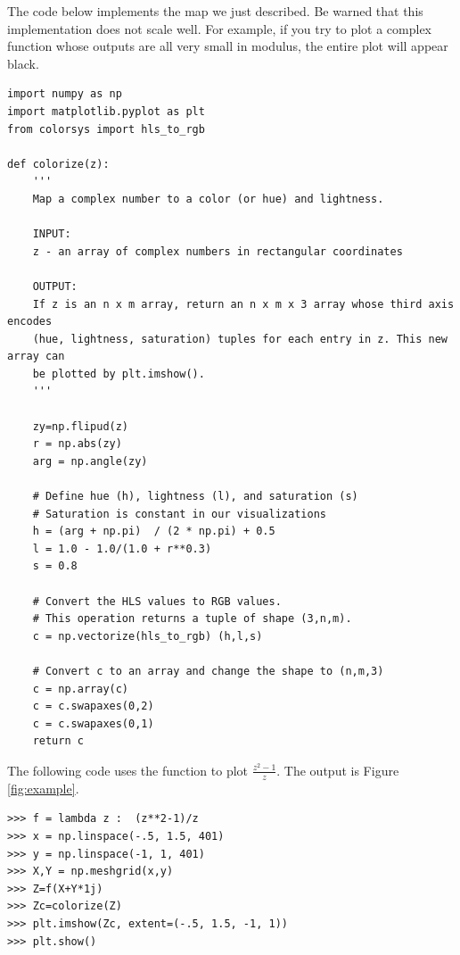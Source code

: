 The code below implements the map we just described.
Be warned that this implementation does not scale well.
For example, if you try to plot a complex function whose outputs are all very small in modulus, the entire plot will appear black.


\begin{lstlisting}
import numpy as np
import matplotlib.pyplot as plt
from colorsys import hls_to_rgb

def colorize(z):
    ''' 
    Map a complex number to a color (or hue) and lightness.
    
    INPUT:
    z - an array of complex numbers in rectangular coordinates
    
    OUTPUT:
    If z is an n x m array, return an n x m x 3 array whose third axis encodes 
    (hue, lightness, saturation) tuples for each entry in z. This new array can 
    be plotted by plt.imshow().
    '''
    
    zy=np.flipud(z)
    r = np.abs(zy)
    arg = np.angle(zy)

    # Define hue (h), lightness (l), and saturation (s)
    # Saturation is constant in our visualizations
    h = (arg + np.pi)  / (2 * np.pi) + 0.5
    l = 1.0 - 1.0/(1.0 + r**0.3)
    s = 0.8

    # Convert the HLS values to RGB values.
    # This operation returns a tuple of shape (3,n,m).
    c = np.vectorize(hls_to_rgb) (h,l,s) 
    
    # Convert c to an array and change the shape to (n,m,3)
    c = np.array(c)  
    c = c.swapaxes(0,2)
    c = c.swapaxes(0,1)
    return c
\end{lstlisting}

The following code uses the  function to plot  $\frac{z^2 - 1}{z}$. The output is Figure \ref{fig:example}.

\begin{lstlisting}
>>> f = lambda z :  (z**2-1)/z
>>> x = np.linspace(-.5, 1.5, 401)
>>> y = np.linspace(-1, 1, 401)
>>> X,Y = np.meshgrid(x,y)
>>> Z=f(X+Y*1j)
>>> Zc=colorize(Z)
>>> plt.imshow(Zc, extent=(-.5, 1.5, -1, 1))
>>> plt.show()
\end{lstlisting}

